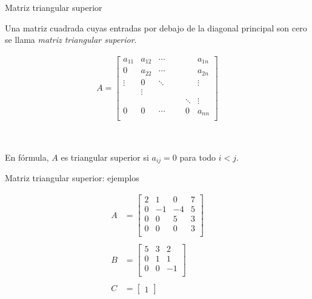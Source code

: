 \documentclass[handout]{beamer} %
\renewcommand{\_}[1]{_{\left[ #1 \right]}}
\renewcommand{\^}[1]{^{\left[ #1 \right]}}
\begin{document}
\begin{frame}{Matriz triangular superior}
	
	Una matriz cuadrada cuyas entradas por debajo de la diagonal principal son cero se llama \textit{matriz triangular superior}.
	
	
	\begin{align*}
		A=
		\left[
		\begin{array}{ccccccc}
			a_{11} & a_{12} & \cdots & & &  & a_{1n}\\ 
			0 & a_{22} & \cdots & & &  & a_{2n}\\
			\vdots & 0 & \ddots & & &  & \vdots\\
			& \vdots &  & & &&  \\
			& &  & & &\ddots& \vdots \\
			0 & 0 & \cdots & & & 0& a_{nn}\\ 
		\end{array}
		\right]
	\end{align*}
	
	\
	
	En f\'ormula, $A$ es triangular superior si $a_{ij}=0$ para todo $i<j$.
\end{frame}

\begin{frame}{Matriz triangular superior:  ejemplos }
	
	\begin{align*}
		A&=
		\begin{bmatrix}
			2 & 1 & 0 & 7\\ 
			0 & -1 & -4& 5\\
			0&0 & 5 & 3 \\
			0&0& 0 & 3 \\
		\end{bmatrix}
		\\
	&
		\\
		B&=
		\begin{bmatrix}
			5 &  3 & 2\\ 
			0 & 1  & 1\\
			0& 0 & -1 \\
		\end{bmatrix}
		\\
	&
		\\
		C&=
		\begin{bmatrix}
			1
		\end{bmatrix}
	\end{align*}

	\vskip 1cm
\end{frame}
\end{document}
